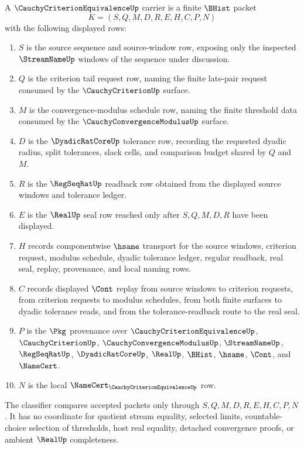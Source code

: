 \begin{definition}
\label{def:cauchy-criterion-equivalence-carrier}
A $\CauchyCriterionEquivalenceUp$ carrier is a finite $\BHist$ packet
$$
K=(S,Q,M,D,R,E,H,C,P,N)
$$
with the following displayed rows:
\begin{enumerate}
\item $S$ is the source sequence and source-window row, exposing only the inspected $\StreamNameUp$ windows of the sequence under discussion.
\item $Q$ is the criterion tail request row, naming the finite late-pair request consumed by the $\CauchyCriterionUp$ surface.
\item $M$ is the convergence-modulus schedule row, naming the finite threshold data consumed by the $\CauchyConvergenceModulusUp$ surface.
\item $D$ is the $\DyadicRatCoreUp$ tolerance row, recording the requested dyadic radius, split tolerances, slack cells, and comparison budget shared by $Q$ and $M$.
\item $R$ is the $\RegSeqRatUp$ readback row obtained from the displayed source windows and tolerance ledger.
\item $E$ is the $\RealUp$ seal row reached only after $S,Q,M,D,R$ have been displayed.
\item $H$ records componentwise $\hsame$ transport for the source windows, criterion request, modulus schedule, dyadic tolerance ledger, regular readback, real seal, replay, provenance, and local naming rows.
\item $C$ records displayed $\Cont$ replay from source windows to criterion requests, from criterion requests to modulus schedules, from both finite surfaces to dyadic tolerance reads, and from the tolerance-readback route to the real seal.
\item $P$ is the $\Pkg$ provenance over $\CauchyCriterionEquivalenceUp$, $\CauchyCriterionUp$, $\CauchyConvergenceModulusUp$, $\StreamNameUp$, $\RegSeqRatUp$, $\DyadicRatCoreUp$, $\RealUp$, $\BHist$, $\hsame$, $\Cont$, and $\NameCert$.
\item $N$ is the local $\NameCert_{\CauchyCriterionEquivalenceUp}$ row.
\end{enumerate}
The classifier compares accepted packets only through $S,Q,M,D,R,E,H,C,P,N$. It has no coordinate for quotient stream equality, selected limits, countable-choice selection of thresholds, host real equality, detached convergence proofs, or ambient $\RealUp$ completeness.
\end{definition}


